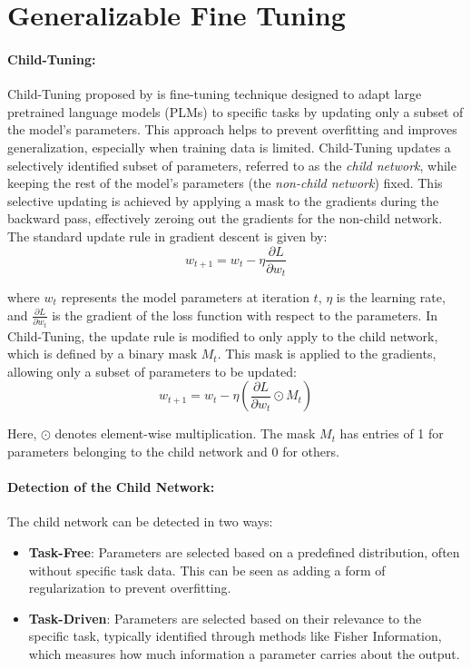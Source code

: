 \section{Generalizable Fine Tuning}
\paragraph{Child-Tuning:} Child-Tuning proposed by \citet{xu2021raise} is fine-tuning technique designed to adapt large pretrained language models (PLMs) to specific tasks by updating only a subset of the model's parameters. This approach helps to prevent overfitting and improves generalization, especially when training data is limited. Child-Tuning updates a selectively identified subset of parameters, referred to as the \emph{child network}, while keeping the rest of the model's parameters (the \emph{non-child network}) fixed. This selective updating is achieved by applying a mask to the gradients during the backward pass, effectively zeroing out the gradients for the non-child network. The standard update rule in gradient descent is given by:
\begin{equation}
	w_{t+1} = w_t - \eta \frac{\partial L}{\partial w_t}
\end{equation}

where $w_t$ represents the model parameters at iteration $t$, $\eta$ is the learning rate, and $\frac{\partial L}{\partial w_t}$ is the gradient of the loss function with respect to the parameters. In Child-Tuning, the update rule is modified to only apply to the child network, which is defined by a binary mask $M_t$. This mask is applied to the gradients, allowing only a subset of parameters to be updated:
\begin{equation}
	w_{t+1} = w_t - \eta (\frac{\partial L}{\partial w_t} \odot M_t)
\end{equation}

Here, $\odot$ denotes element-wise multiplication. The mask $M_t$ has entries of 1 for parameters belonging to the child network and 0 for others.

\paragraph{Detection of the Child Network:} The child network can be detected in two ways:
\begin{itemize}
	\item \textbf{Task-Free}: Parameters are selected based on a predefined distribution, often without specific task data. This can be seen as adding a form of regularization to prevent overfitting.
	\item \textbf{Task-Driven}: Parameters are selected based on their relevance to the specific task, typically identified through methods like Fisher Information, which measures how much information a parameter carries about the output.
\end{itemize}

